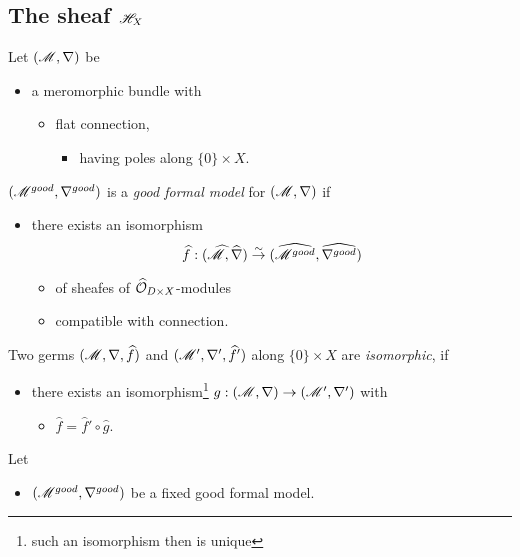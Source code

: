 \subsection{The sheaf $\mathscr{H}_X$}
\begin{defn}
  Let $(\mathscr{M},\nabla)$ be
  \begin{itemize}
    \item a meromorphic bundle
      with
      \begin{itemize}
        \item flat connection,
          \begin{itemize}
            \item having poles along $\{0\}\times X$.
          \end{itemize}
      \end{itemize}
  \end{itemize}
  \begin{defn}
    $(\mathscr{M}^{good},\nabla^{good})$ is a \emph{good formal model} for
    $(\mathscr{M},\nabla)$ if
    \begin{itemize}
      \item there exists an isomorphism
        \[
          \widehat f:(\widehat{\mathscr{M}},\widehat\nabla)\overset{\sim}{\to}
          (\widehat{\mathscr{M}^{good}},\widehat{\nabla^{good}})
        \]
        \begin{itemize}
          \item of sheafes of $\widehat{\mathcal{O}}_{D\times X}$-modules
          \item compatible with connection.
        \end{itemize}
    \end{itemize}
  \end{defn}
  \begin{defn}
    Two germs $(\mathscr{M},\nabla,\widehat f)$ and $(\mathscr{M}',\nabla',\widehat f')$ along
    $\{0\}\times X$ are \emph{isomorphic}, if
    \begin{itemize}
      \item there exists an isomorphism\footnote{such an isomorphism then is
        unique} $g:(\mathscr{M},\nabla)\to(\mathscr{M}',\nabla')$ with
        \begin{itemize}
          \item $\hat f=\hat f'\circ\hat g$.
        \end{itemize}
    \end{itemize}
  \end{defn}
  Let
  \begin{itemize}
    \item $(\mathscr{M}^{good},\nabla^{good})$ be a fixed good formal model.

\end{itemize}
\end{defn}

